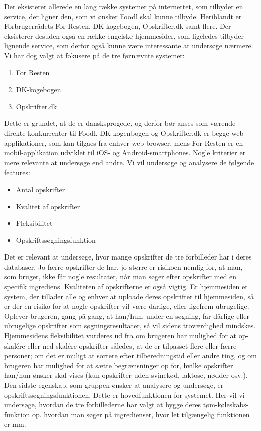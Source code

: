 
Der eksisterer allerede en lang række systemer på internettet, som tilbyder en service, der ligner den, som vi ønsker Foodl skal kunne tilbyde. Heriblandt er Forbrugerrådets For Resten, DK-kogebogen, Opskrifter.dk samt flere. Der eksisterer desuden også en række engelske hjemmesider, som ligeledes tilbyder lignende service, som derfor også kunne være interessante at undersøge nærmere. Vi har dog valgt at fokusere på de tre førnævnte systemer: 

\begin{enumerate}[noitemsep]
  \item \href{https://play.google.com/store/apps/details?id=com.nodes.forresten}{For Resten} \cite{forresten}
  \item \href{http://www.dk-kogebogen.dk/}{DK-kogebogen} \cite{dkkogebogen}
  \item \href{http://opskrifter.dk/}{Opskrifter.dk} \cite{opskrifterdk}
\end{enumerate}

Dette er grundet, at de er dansksprogede, og derfor bør anses som værende direkte konkurrenter til Foodl. DK-kogenbogen og Opskrifter.dk er begge web-applikationer, som kan tilgåes fra enhver web-browser, mens For Resten er en mobil-applikation udviklet til iOS- og Android-smartphones. Nogle kriterier er mere relevante at undersøge end andre. Vi vil undersøge og analysere de følgende features:

\begin{itemize}[noitemsep]
  \item Antal opskrifter
  \item Kvalitet af opskrifter
  \item Fleksibilitet
  \item Opskriftssøgningsfunktion
\end{itemize}

Det er relevant at undersøge, hvor mange opskrifter de tre forbilleder har i deres databaser. Jo færre opskrifter de har, jo større er risikoen nemlig for, at man, som bruger, ikke får nogle resultater, når man søger efter opskrifter med en specifik ingrediens. Kvaliteten af opskrifterne er også vigtig. Er hjemmesiden \fx et system, der tillader alle og enhver at uploade deres opskrifter til hjemmesiden, så er der en risiko for at nogle opskrifter vil være dårlige, eller ligefrem ubrugelige. Oplever brugeren, gang på gang, at han/hun, under en søgning, får dårlige eller ubrugelige opskrifter som søgningsresultater, så vil sidens troværdighed mindskes. 
Hjemmesidens fleksibilitet vurderes ud fra om brugeren har mulighed for \fx at op-skalére eller ned-skalére opskrifter således, at de er tilpasset flere eller færre personer; om det er muligt at sortere efter tilberedningstid eller andre ting, og om brugeren har mulighed for at sætte begrænsninger op for, hvilke opskrifter han/hun ønsker skal vises (\fx kun opskrifter uden svinekød, laktose, nødder osv.). Den sidste egenskab, som gruppen ønsker at analysere og undersøge, er opskriftssøgningsfunktionen. Dette er hovedfunktionen for systemet. Her vil vi undersøge, hvordan de tre forbillederne har valgt at bygge deres tøm-køleskabs-funktion op. \Fx hvordan man søger på ingredienser, hvor let tilgængelig funktionen er mm.